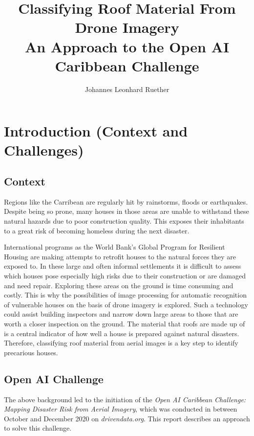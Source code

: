 \documentclass[11pt]{article}
\title{\bf{Classifying Roof Material From Drone Imagery} \\
 An Approach to the Open AI Caribbean Challenge}
\author{Johannes Leonhard Ruether}
\begin{document}
	\maketitle
	
	\section{Introduction (Context and Challenges)}
	
	\subsection{Context}
	
	Regions like the Carribean are regularly hit by rainstorms, floods or earthquakes. Despite being so prone, many houses in those areas are unable to withstand these natural hazards due to poor construction quality. This exposes their inhabitants to a great risk of becoming homeless during the next disaster. 
	
	International programs as the World Bank's Global Program for Resilient Housing are making attempts to retrofit houses to the natural forces they are exposed to. In these large and often informal settlements it is difficult to assess which houses pose especially high risks due to their construction or are damaged and need repair. Exploring these areas on the ground is time consuming and costly. 
	This is why the possibilities of image processing for automatic recognition of vulnerable houses on the basis of drone imagery is explored. Such a technology could assist building inspectors and narrow down large areas to those that are worth a closer inspection on the ground. 
	The material that roofs are made up of is a central indicator of how well a house is prepared against natural disasters. Therefore, classifying roof material from aerial images is a key step to identify precarious houses. \\
	
	\subsection{Open AI Challenge}
	
	The above background led to the initiation of the \textit{Open AI Caribbean Challenge: Mapping Disaster Risk from Aerial Imagery}, which was conducted in between October and December 2020 on \textit{drivendata.org}.	
	This report describes an approach to solve this challenge.\\
	
\end{document}
